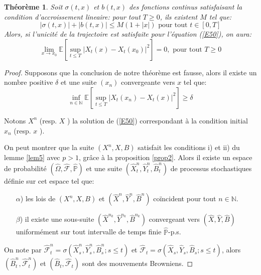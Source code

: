 \documentclass[A4paper,12pt]{report}
\newtheorem{theorem}{Th\'eor\`eme}[chapter]
\newcommand{\N}{{\mathbb{N}}}
\newcommand{\E}{{\mathbb{E}}}
\newcommand{\pr}{{\mathbb{P}}}
\begin{document}
\begin{theorem}\label{thm3}
Soit $\sigma(t, x)$ et $b(t, x)$ des fonctions continus satisfaisant la condition d'accroissement lineaire: pour tout $T \geq 0$, ils existent $M$ tel que:
\begin{equation}\label{E14}
|\sigma(t, x)|+|b(t, x)| \leq M(1+|x|) \text { pour tout } t \in[0, T]
\end{equation}
Alors, si l'unicité de la trajectoire est satisfaite pour l'équation (\ref{E50}), on aura:
$$
\lim _{x \rightarrow x_{0}} \E\left[\sup _{t \leq T}\left|X_{t}(x)-X_{t}\left(x_{0}\right)\right|^{2}\right]=0, \text { pour tout } T \geq 0
$$
\end{theorem}
\begin{proof}
Supposons que la conclusion de notre théorème est fausse, alors il existe un nombre positive  $\delta$ et une suite $\left(x_{n}\right)$ convergeante vers $x$ tel que:
\begin{equation}\label{cond}
\inf _{n \in \mathbb{N}} \E\left[\sup _{t \leq T}\left|X_{t}\left(x_{n}\right)-X_{t}(x)\right|^{2}\right] \geq \delta
\end{equation}

Notons $X^{n}$ (resp. $X$ ) la solution de (\ref{E50}) correspondant à la condition initial  $x_{n}$ (resp. $x$ ).

On peut montrer que la suite $\left(X^{n}, X, B\right)$ satisfait les conditions i) et ii) du lemme \ref{lem5} avec $p>1$, grâce à la proposition \ref{prop2}.
Alors il existe un espace de probabilité $(\widehat{\Omega}, \widehat{\mathcal{F}}, \widehat{\pr})$ et une suite $\left(\widehat{X}_{t}^{n}, \widehat{Y}_{t}^{n}, \widehat{B}_{t}^{n}\right)$ de processus stochastiques  définie sur cet espace tel que:
\begin{itemize}
\item[$\alpha$)]les lois de $\left(X^{n}, X, B\right)$ et $\left(\widehat{X}^{n}, \widehat{Y}^{n}, \widehat{B}^{n}\right)$ coïncident pour tout $n \in \N$.

\item[$\beta$)]il existe une sous-suite $\left(\widehat{X}^{n_{k}}, \widehat{Y}^{n_{k}}, \widehat{B}^{n_{k}}\right)$ convergeant vers $(\widehat{X}, \widehat{Y}, \widehat{B})$ uniformément sur tout intervalle de temps finie $\widehat{\pr}$-p.s.
\end{itemize}


On note par $\widehat{\mathcal{F}}_{t}^{n}=\sigma\left(\widehat{X}_{s}^{n}, \widehat{Y}_{s}^{n}, \widehat{B}_{s}^{n} ; s \leq t\right)$ et $\widehat{\mathcal{F}}_{t}=\sigma\left(\widehat{X}_{s}, \widehat{Y}_{s}, \widehat{B}_{s} ; s \leq t\right)$, alors $\left(\widehat{B}_{t}^{n}, \widehat{\mathcal{F}}_{t}^{n}\right)$ et $\left(\widehat{B}_{t}, \widehat{\mathcal{F}}_{t}\right)$ sont des mouvements Browniens.


\end{proof}
\end{document}

